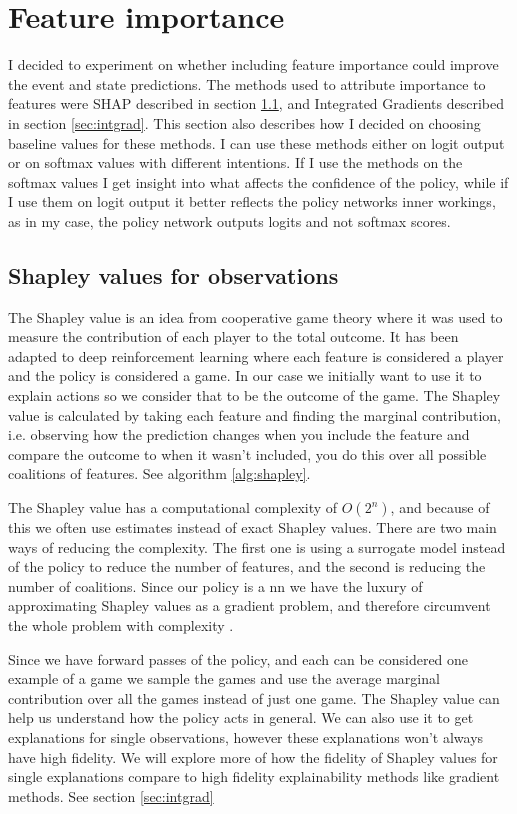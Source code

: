 \documentclass[UKenglish]{uiomasterthesis}
\begin{document}
\section{Feature importance}
\label{sec:feat_imp_meth}
I decided to experiment on whether including feature importance could improve the event and state predictions. The methods used to attribute importance to features were SHAP described in section \ref{sec:shap_meth}, and Integrated Gradients described in section \ref{sec:intgrad}. This section also describes how I decided on choosing baseline values for these methods.
I can use these methods either on logit output or on softmax values with different intentions. If I use the methods on the softmax values I get insight into what affects the confidence of the policy, while if I use them on logit output it better reflects the policy networks inner workings, as in my case, the policy network outputs logits and not softmax scores.

\subsection{Shapley values for observations}
\label{sec:shap_meth}
The Shapley value is an idea from cooperative game theory where it was used to measure the contribution of each player to the total outcome. It has been adapted to deep reinforcement learning where each feature is considered a player and the policy is considered a game. In our case we initially want to use it to explain actions so we consider that to be the outcome of the game. The Shapley value is calculated by taking each feature and finding the marginal contribution, i.e. observing how the prediction changes when you include the feature and compare the outcome to when it wasn't included, you do this over all possible coalitions of features. See algorithm \ref{alg:shapley}.

The Shapley value has a computational complexity of $O(2^n)$, and because of this we often use estimates instead of exact Shapley values. There are two main ways of reducing the complexity. The first one is using a surrogate model instead of the policy to reduce the number of features, and the second is reducing the number of coalitions. Since our policy is a \ac{nn} we have the luxury of approximating Shapley values as a gradient problem, and therefore circumvent the whole problem with complexity \cite{captum_shap}.

Since we have forward passes of the policy, and each can be considered one example of a game we sample the games and use the average marginal contribution over all the games instead of just one game.
The Shapley value can help us understand how the policy acts in general. We can also use it to get explanations for single observations, however these explanations won't always have high fidelity. We will explore more of how the fidelity of Shapley values for single explanations compare to high fidelity explainability methods like gradient methods. See section \ref{sec:intgrad}
\end{document}
